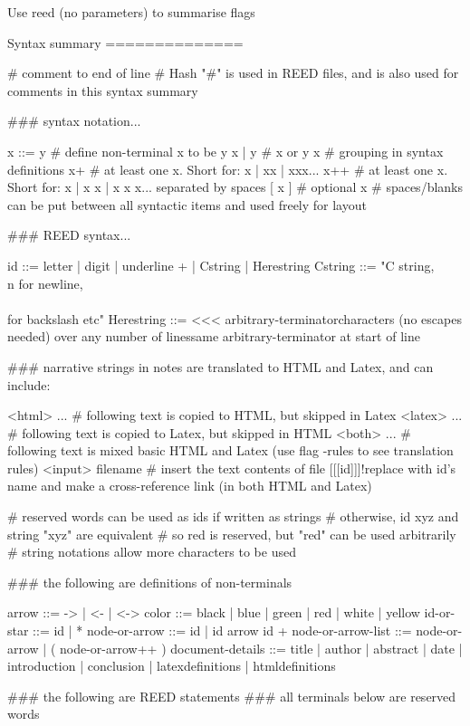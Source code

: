 Use reed (no parameters) to summarise flags

Syntax summary
==============

# comment to end of line
# Hash "#" is used in REED files, and is also used for comments in this syntax summary

### syntax notation...

x ::= y # define non-terminal x to be y
x | y   # x or y
{ x }   # grouping in syntax definitions
x+      # at least one x. Short for: x | xx | xxx...
x++     # at least one x. Short for: x | x x | x x x... separated by spaces
[ x ]   # optional x
        # spaces/blanks can be put between all syntactic items and used freely for layout 

### REED syntax...

id ::= { letter | digit | underline }+ | Cstring | Herestring
Cstring ::= "C string, \\n for newline, \\\\ for backslash etc" 
Herestring ::= <<< arbitrary-terminator\n                           characters (no escapes needed) over any number of lines\n                       same arbitrary-terminator at start of line

### narrative strings in notes are translated to HTML and Latex, and can include:

<html> ...        # following text is copied to HTML, but skipped in Latex
<latex> ...       # following text is copied to Latex, but skipped in HTML
<both> ...        # following text is mixed basic HTML and Latex (use flag -rules to see translation rules)
<input> filename  # insert the text contents of file
[[[id]]]!replace with id's name and make a cross-reference link (in both HTML and Latex)

# reserved words can be used as ids if written as strings
# otherwise, id xyz and string "xyz" are equivalent
# so red is reserved, but "red" can be used arbitrarily
# string notations allow more characters to be used

### the following are definitions of non-terminals

arrow ::= -> | <- | <->
color ::= black | blue | green | red | white | yellow
id-or-star ::= id | *
node-or-arrow ::= id | id { arrow id }+
node-or-arrow-list ::= node-or-arrow | ( node-or-arrow++ )
document-details ::= title | author | abstract | date | introduction | conclusion | latexdefinitions | htmldefinitions

### the following are REED statements
### all terminals below are reserved words

